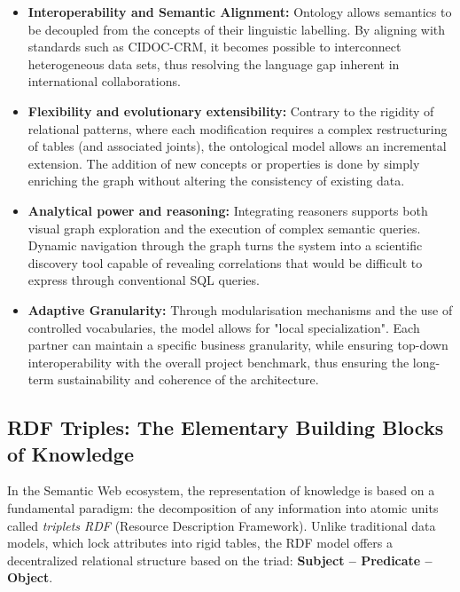 \documentclass{article}
\begin{document}
\begin{itemize}
\item \textbf{Interoperability and Semantic Alignment:} Ontology allows semantics to be decoupled from the concepts of their linguistic labelling. By aligning with standards such as CIDOC-CRM, it becomes possible to interconnect heterogeneous data sets, thus resolving the language gap inherent in international collaborations.
\item \textbf {Flexibility and evolutionary extensibility:} Contrary to the rigidity of relational patterns, where each modification requires a complex restructuring of tables (and associated joints), the ontological model allows an incremental extension. The addition of new concepts or properties is done by simply enriching the graph without altering the consistency of existing data.
\item \textbf{Analytical power and reasoning:} Integrating reasoners supports both visual graph exploration and the execution of complex semantic queries. Dynamic navigation through the graph turns the system into a scientific discovery tool capable of revealing correlations that would be difficult to express through conventional SQL queries.
\item \textbf {Adaptive Granularity:} Through modularisation mechanisms and the use of controlled vocabularies, the model allows for "local specialization". Each partner can maintain a specific business granularity, while ensuring top-down interoperability with the overall project benchmark, thus ensuring the long-term sustainability and coherence of the architecture.
\end{itemize}

\subsection{RDF Triples: The Elementary Building Blocks of Knowledge}

In the Semantic Web ecosystem, the representation of knowledge is based on a fundamental paradigm: the decomposition of any information into atomic units called \textit{triplets RDF} (Resource Description Framework). Unlike traditional data models, which lock attributes into rigid tables, the RDF model offers a decentralized relational structure based on the triad: \textbf{Subject – Predicate – Object}.
\end{document}
